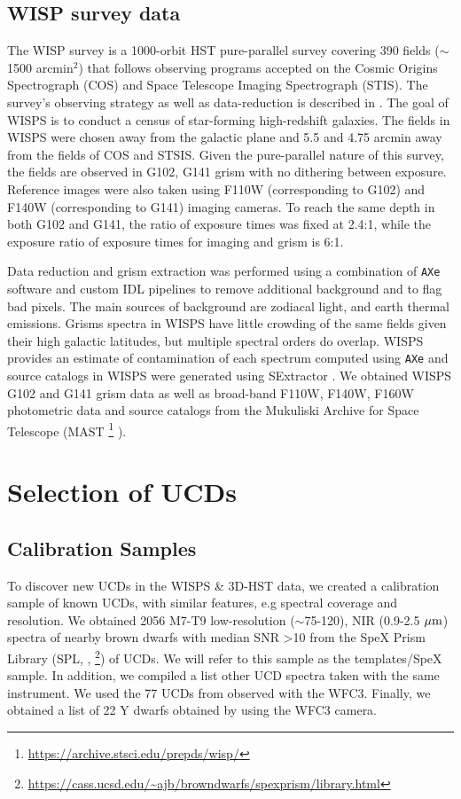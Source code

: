 \documentclass[manuscript]{aastex63}
\begin{document}
\subsection{WISP survey data}
The WISP survey is a 1000-orbit HST pure-parallel survey covering 390 fields ($\sim$1500 arcmin$^2$) that follows observing programs accepted on the Cosmic Origins Spectrograph (COS) and Space Telescope Imaging Spectrograph (STIS). The survey's observing strategy as well as data-reduction is described in \cite{2010ApJ...723..104A}. The goal of WISPS is to conduct a census of star-forming high-redshift galaxies. The fields in WISPS were chosen away from the galactic plane and  5.5 and 4.75 arcmin away from the fields of COS and STSIS. Given the pure-parallel nature of this survey, the fields are observed in G102, G141 grism with no dithering between exposure. Reference images were also taken using F110W (corresponding to G102) and F140W (corresponding to G141) imaging cameras. To reach the same depth in both G102 and G141, the ratio of exposure times was fixed at 2.4:1, while the exposure ratio of exposure times for imaging and grism is 6:1.

Data reduction and grism extraction was performed using a combination of \texttt{AXe} software \citep{Kuntschner2013, Kummel2009} and custom IDL pipelines to remove additional background and to flag bad pixels. The main sources of background are zodiacal light, and earth thermal emissions. Grisms spectra in WISPS have little crowding of the same fields given their high galactic latitudes, but multiple spectral orders do overlap. WISPS provides an estimate of contamination of each spectrum computed using \texttt{AXe} and source catalogs in WISPS were generated using SExtractor \citep{1996A&AS..117..393B}. We obtained WISPS G102 and G141 grism data as well as broad-band F110W, F140W, F160W photometric data and source catalogs from the Mukuliski Archive for Space Telescope (MAST \footnote{\url{https://archive.stsci.edu/prepds/wisp/}} ). 


\section{Selection of UCDs}\label{sec:selectionp}

\subsection{Calibration Samples}\label{sec:trainset}
To discover new UCDs in the WISPS \& 3D-HST data, we created a calibration sample of known UCDs, with similar features, e.g spectral coverage and resolution. We obtained 2056 M7-T9 low-resolution ($\sim$75-120), NIR (0.9-2.5 $\mbox{$\mu$m}$) spectra of nearby brown dwarfs with median SNR \textgreater 10 from the SpeX Prism Library (SPL, \citealt{2014arXiv1406.4887B}, \footnote{\url{https://cass.ucsd.edu/~ajb/browndwarfs/spexprism/library.html}}) of UCDs. We will refer to this sample as the templates/SpeX sample. In addition, we compiled a list other UCD spectra taken with the same instrument. We used the 77 UCDs from \cite{Manjavacas2018} observed with the WFC3. Finally, we obtained a list of 22 Y dwarfs obtained by \cite{Schneider2015} using the WFC3 camera. 
\end{document}
